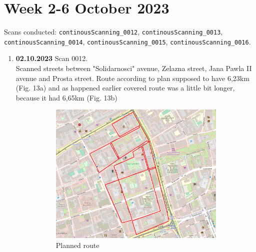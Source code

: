 \documentclass[a4paper,12pt]{article}
\begin{document}
\section{Week 2-6 October 2023}
Scans conducted: \verb|continousScanning_0012|, \verb|continousScanning_0013|, \verb|continousScanning_0014|, \verb|continousScanning_0015|, \verb|continousScanning_0016|.\\
\begin{enumerate}
	\item \textbf{02.10.2023} Scan 0012. \\
	Scanned streets between "Solidarnosci" avenue, Zelazna street, Jana Pawla II avenue and Prosta street. Route according to plan supposed to have 6,23km (Fig. 13a) and as happened earlier covered route was a little bit longer, because it had 6,65km (Fig. 13b)
	\begin{figure}[H]
		\centering
		\begin{subfigure}{.77\textwidth}
			\centering
			\includegraphics[width=1\linewidth]{route_p12}
			\caption{Planned route}
			\label{fig:a12}
		\end{subfigure}%
		\linebreak
		\begin{subfigure}{.77\textwidth}
			\centering

\end{subfigure}
\end{figure}
\end{enumerate}
\end{document}

